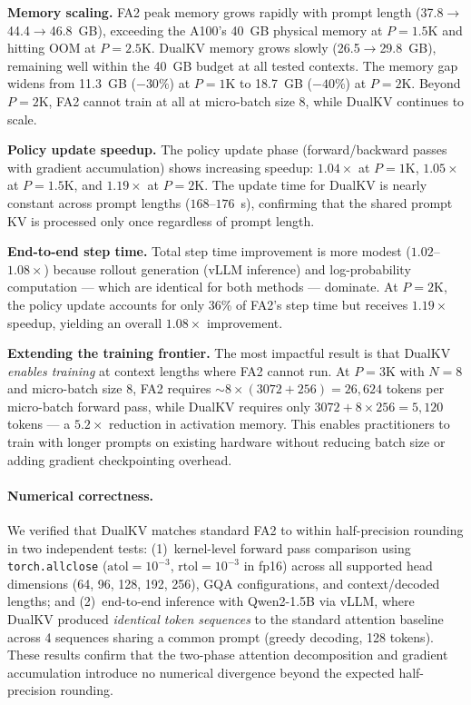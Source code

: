 \documentclass{article}
\begin{document}
\textbf{Memory scaling.} FA2 peak memory grows rapidly with prompt length (37.8$\to$44.4$\to$46.8~GB), exceeding the A100's 40~GB physical memory at $P{=}1.5\text{K}$ and hitting OOM at $P{=}2.5\text{K}$. DualKV memory grows slowly (26.5$\to$29.8~GB), remaining well within the 40~GB budget at all tested contexts. The memory gap widens from 11.3~GB ($-30\%$) at $P{=}1\text{K}$ to 18.7~GB ($-40\%$) at $P{=}2\text{K}$. Beyond $P{=}2\text{K}$, FA2 cannot train at all at micro-batch size 8, while DualKV continues to scale.

\textbf{Policy update speedup.} The policy update phase (forward/backward passes with gradient accumulation) shows increasing speedup: $1.04\times$ at $P{=}1\text{K}$, $1.05\times$ at $P{=}1.5\text{K}$, and $1.19\times$ at $P{=}2\text{K}$. The update time for DualKV is nearly constant across prompt lengths ($168$--$176$~s), confirming that the shared prompt KV is processed only once regardless of prompt length.

\textbf{End-to-end step time.} Total step time improvement is more modest ($1.02$--$1.08\times$) because rollout generation (vLLM inference) and log-probability computation --- which are identical for both methods --- dominate. At $P{=}2\text{K}$, the policy update accounts for only 36\% of FA2's step time but receives $1.19\times$ speedup, yielding an overall $1.08\times$ improvement.

\textbf{Extending the training frontier.} The most impactful result is that DualKV \emph{enables training} at context lengths where FA2 cannot run. At $P{=}3\text{K}$ with $N{=}8$ and micro-batch size 8, FA2 requires ${\sim}8 \times (3072{+}256) = 26,624$ tokens per micro-batch forward pass, while DualKV requires only $3072 + 8 \times 256 = 5,120$ tokens --- a $5.2\times$ reduction in activation memory. This enables practitioners to train with longer prompts on existing hardware without reducing batch size or adding gradient checkpointing overhead.

\paragraph{Numerical correctness.} We verified that DualKV matches standard FA2 to within half-precision rounding in two independent tests: (1)~kernel-level forward pass comparison using \texttt{torch.allclose} ($\text{atol}{=}10^{-3}$, $\text{rtol}{=}10^{-3}$ in fp16) across all supported head dimensions (64, 96, 128, 192, 256), GQA configurations, and context/decoded lengths; and (2)~end-to-end inference with Qwen2-1.5B via vLLM, where DualKV produced \emph{identical token sequences} to the standard attention baseline across 4 sequences sharing a common prompt (greedy decoding, 128 tokens). These results confirm that the two-phase attention decomposition and gradient accumulation introduce no numerical divergence beyond the expected half-precision rounding.
\end{document}
